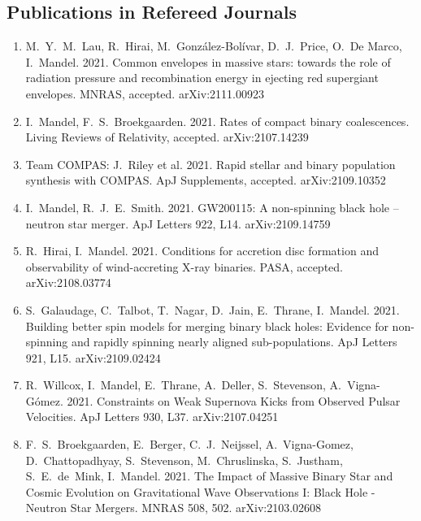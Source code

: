 \documentclass[margin,line]{res}
\begin{document}
\begin{resume}
\newpage

\section{\sc Publications in Refereed Journals}

\begin{enumerate}

\item M.~Y.~M.~Lau, R.~Hirai, M.~Gonz\'alez-Bol\'ivar, D.~J.~Price, O.~De Marco, I.~Mandel. 2021. Common envelopes in massive stars: towards the role of radiation pressure and recombination energy in ejecting red supergiant envelopes. MNRAS, accepted.  arXiv:2111.00923

\item I.~Mandel, F.~S.~Broekgaarden. 2021. Rates of compact binary coalescences.  Living Reviews of Relativity, accepted.  arXiv:2107.14239

\item Team COMPAS: J.~Riley et al. 2021.  Rapid stellar and binary population synthesis with COMPAS.  ApJ Supplements, accepted.  arXiv:2109.10352

\item I.~Mandel, R.~J.~E.~Smith.  2021.  GW200115: A non-spinning black hole -- neutron star merger.  ApJ Letters 922, L14. arXiv:2109.14759

\item R.~Hirai, I.~Mandel. 2021. Conditions for accretion disc formation and observability of wind-accreting X-ray binaries. PASA, accepted.  arXiv:2108.03774 

\item S.~Galaudage, C.~Talbot, T.~Nagar, D.~Jain, E.~Thrane, I.~Mandel.  2021. Building better spin models for merging binary black holes: Evidence for non-spinning and rapidly spinning nearly aligned sub-populations. ApJ Letters 921, L15.  arXiv:2109.02424

\item R.~Willcox, I.~Mandel, E.~Thrane, A.~Deller, S.~Stevenson, A.~Vigna-G{\'o}mez.  2021. Constraints on Weak Supernova Kicks from Observed Pulsar Velocities.  ApJ Letters 930, L37.  arXiv:2107.04251 

\item F.~S.~Broekgaarden, E.~Berger, C.~J.~Neijssel, A.~Vigna-Gomez, D.~Chattopadhyay, S.~Stevenson, M.~Chruslinska, S.~Justham, S.~E.~de~Mink, I.~Mandel. 2021. The Impact of Massive Binary Star and Cosmic Evolution on Gravitational Wave Observations I: Black Hole - Neutron Star Mergers.  MNRAS 508, 502. arXiv:2103.02608


\end{enumerate}
\end{resume}
\end{document}
